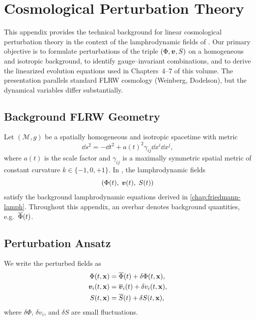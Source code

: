 
\chapter{Cosmological Perturbation Theory}
\label{app:cosmo-perturb}

This appendix provides the technical background for linear cosmological
perturbation theory in the context of the lamphrodynamic fields of
\rsvpabbr{}.  Our primary objective is to formulate perturbations of the
triple $(\Phi,\bm{v},S)$ on a homogeneous and isotropic
background, to identify gauge--invariant combinations, and to derive the
linearized evolution equations used in Chapters~4--7 of this volume.
The presentation parallels standard FLRW cosmology (Weinberg, Dodelson),
but the dynamical variables differ substantially.

\section{Background FLRW Geometry}

Let $(\mathcal M,g)$ be a spatially homogeneous and isotropic spacetime
with metric
\begin{equation}
\label{eq:flrw-metric}
\dd s^2 = -\dd t^2 + a(t)^2\gamma_{ij}\dd x^i\dd x^j,
\end{equation}
where $a(t)$ is the scale factor and $\gamma_{ij}$ is a maximally
symmetric spatial metric of constant curvature $k\in\{-1,0,+1\}$.  In
\rsvpabbr{}, the lamphrodynamic fields
\[
(\Phi(t),\;\bm{v}(t),\;S(t))
\]
satisfy the background lamphrodynamic equations derived in
\cref{chap:friedmann-lamph}.  Throughout this appendix, an overbar
denotes background quantities, e.g.\ $\overline{\Phi}(t)$.

\section{Perturbation Ansatz}

We write the perturbed fields as
\begin{equation}
\begin{aligned}
\Phi(t,\mathbf x) &= \overline{\Phi}(t) + \delta\Phi(t,\mathbf x),\\
\bm{v}_i(t,\mathbf x) &= \overline{\bm{v}}_i(t) + \delta v_i(t,\mathbf x),\\
S(t,\mathbf x)  &= \overline{S}(t)  + \delta S(t,\mathbf x),
\end{aligned}
\end{equation}
where $\delta\Phi$, $\delta v_i$, and $\delta S$ are small fluctuations.

